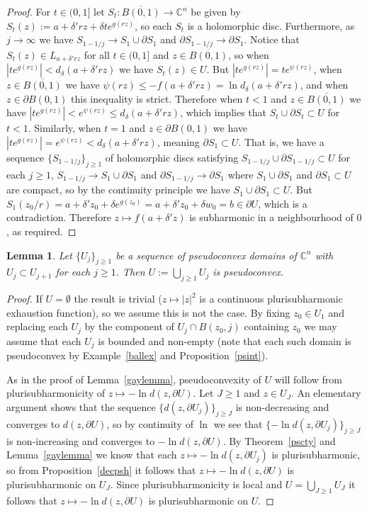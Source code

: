 \documentclass[11pt,a4paper, final, twoside]{article}
\newtheorem{lemma}[theorem]{Lemma}
\numberwithin{equation}{section}
\newcommand{\C}{\mathbb C}
\newcommand{\clos}[1]{\overline{#1}}
\newcommand{\bd}{\partial}
\newcommand{\ball}{B}
\newcommand{\emetric}{d}
\begin{document}
\begin{proof}
For $t\in (0,1]$ let
$S_t\colon\clos{\ball(0,1)}\to \C^n$ be given by $S_t(z):=a+\delta'rz+\delta t e^{g(rz)}$, so each $S_t$ is a holomorphic disc. Furthermore, as $j\to\infty$ we have $S_{1-1/j}\to S_1\cup \bd S_1$
and $\bd S_{1-1/j}\to \bd S_1$. Notice that $S_t(z)\in L_{a+\delta'rz}$ for all $t\in (0,1]$ and $z\in\clos{\ball(0,1)}$, so when $|te^{g(rz)}|<\emetric_\delta(a+\delta'rz)$
we have $S_t(z)\in U$. But $|te^{g(rz)}|=te^{\psi(rz)}$, when $z\in\clos{\ball(0,1)}$ we have $\psi(rz)\leq -f(a+\delta'rz)=\ln\emetric_\delta(a+\delta'rz)$,
and when $z\in\bd\ball(0,1)$ this inequality is strict.
Therefore when $t<1$ and $z\in\clos{\ball(0,1)}$ we have $|te^{g(rz)}|<e^{\psi(rz)}\leq \emetric_\delta(a+\delta'rz)$, which implies that $S_t\cup\bd S_t\subset U$ for $t<1$. Similarly,
when $t=1$ and $z\in\bd\ball(0,1)$ we have $|te^{g(rz)}|=e^{\psi(rz)}<\emetric_\delta(a+\delta'rz)$, meaning $\bd S_1\subset U$. 
That is, we have a sequence $\{S_{1-1/j}\}_{j\geq 1}$ of holomorphic discs satisfying $S_{1-1/j}\cup\bd S_{1-1/j}\subset U$ for each $j\geq 1$, 
$S_{1-1/j}\to S_1\cup\bd S_1$ and $\bd S_{1-1/j}\to\bd S_1$ where $S_1\cup \bd S_1$ and $\bd S_1\subset U$ are compact, so by the continuity principle we have $S_1\cup\bd S_1\subset U$. But
$S_1(z_0/r)=a+\delta'z_0+\delta e^{g(z_0)}=a+\delta'z_0+\delta w_0=b\in\bd U$, which is a contradiction. Therefore $z\mapsto f(a+\delta' z)$ is subharmonic in a neighbourhood of $0$, as required.
\end{proof}
\begin{lemma}
\label{incps2}
Let $\{U_j\}_{j\geq 1}$ be a sequence of pseudoconvex domains of $\C^n$ with $U_j\subset U_{j+1}$ for each $j\geq 1$. Then $U:=\bigcup_{j\geq 1} U_j$ is pseudoconvex.
\end{lemma}
\begin{proof}
If $U=\emptyset$ the result is trivial ($z\mapsto |z|^2$ is a continuous plurisubharmonic exhaustion function), 
so we assume this is not the case. By fixing $z_0\in U_1$ and replacing each $U_j$ by the component of $U_j\cap \ball(z_0,j)$ containing $z_0$ 
we may assume that each $U_j$ is bounded and non-empty (note that each such domain is pseudoconvex by Example~\ref{ballex} and Proposition~\ref{psint}).

As in the proof of Lemma~\ref{gaylemma}, pseudoconvexity of $U$ will follow from plurisubharmonicity of $z\mapsto -\ln\emetric(z,\bd U)$.
Let $J\geq 1$ and $z\in U_J$. An elementary argument shows that the sequence $\{\emetric(z,\bd U_j)\}_{j\geq J}$ is non-decreasing and converges to $\emetric(z,\bd U)$, so by
continuity of $\ln$ we see that $\{-\ln\emetric(z,\bd U_j)\}_{j\geq J}$ is non-increasing
and converges to $-\ln\emetric(z,\bd U)$.
By Theorem~\ref{pscty} and Lemma~\ref{gaylemma} we know that each $z\mapsto -\ln\emetric(z,\bd U_j)$ is plurisubharmonic, so from
Proposition~\ref{decpsh} it follows that $z\mapsto -\ln\emetric(z,\bd U)$ is plurisubharmonic
 on $U_J$. Since plurisubharmonicity is local and $U=\bigcup_{J\geq 1} U_J$ it follows
that $z\mapsto -\ln\emetric(z,\bd U)$ is plurisubharmonic on $U$.
\end{proof}
\end{document}
